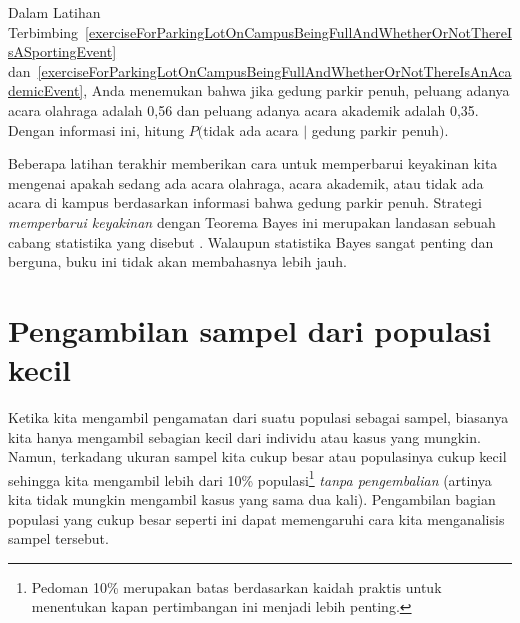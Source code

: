 \begin{exercisewrap}
\begin{nexercise} \label{exerciseForParkingLotOnCampusBeingFullAndWhetherOrNotThereIsNoEvent}
Dalam Latihan Terbimbing~\ref{exerciseForParkingLotOnCampusBeingFullAndWhetherOrNotThereIsASportingEvent} dan~\ref{exerciseForParkingLotOnCampusBeingFullAndWhetherOrNotThereIsAnAcademicEvent}, Anda menemukan bahwa jika gedung parkir penuh, peluang adanya acara olahraga adalah 0,56 dan peluang adanya acara akademik adalah 0,35. Dengan informasi ini, hitung $P($tidak ada acara $|$ gedung parkir penuh$)$.\footnotemark
\end{nexercise}
\end{exercisewrap}

Beberapa latihan terakhir memberikan cara untuk memperbarui keyakinan kita mengenai apakah sedang ada acara olahraga, acara akademik, atau tidak ada acara di kampus berdasarkan informasi bahwa gedung parkir penuh. Strategi \emph{memperbarui keyakinan} dengan Teorema Bayes ini merupakan landasan sebuah cabang statistika yang disebut . Walaupun statistika Bayes sangat penting dan berguna, buku ini tidak akan membahasnya lebih jauh.



{}

\section{Pengambilan sampel dari populasi kecil}
\label{smallPop}

\noindent%
Ketika kita mengambil pengamatan dari suatu populasi sebagai sampel,
biasanya kita hanya mengambil sebagian kecil dari
individu atau kasus yang mungkin.
Namun, terkadang ukuran sampel kita cukup besar
atau populasinya cukup kecil sehingga kita
mengambil lebih dari 10\% populasi\footnote{Pedoman 10\%
  merupakan batas berdasarkan kaidah praktis untuk menentukan kapan
  pertimbangan ini menjadi lebih penting.}
\emph{tanpa
pengembalian} (artinya kita tidak mungkin
mengambil kasus yang sama dua kali).
Pengambilan bagian populasi yang cukup besar seperti ini
dapat memengaruhi cara kita menganalisis
sampel tersebut.

